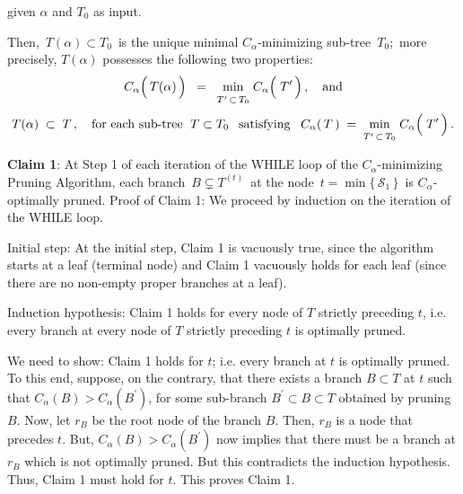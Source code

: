 \begin{proposition}
\begin{itemize}
	given $\alpha$ and $T_{0}$ as input.
\end{itemize}
Then, \,$T(\alpha) \subset T_{0}$\, is the unique
{\color{red}minimal $C_{\alpha}$-minimizing} sub-tree \,$T_{0}$;\,
more precisely, $T(\alpha)$ possesses the following two properties:
\begin{equation*}
C_{\alpha}\!\left(\,\overset{{\color{white}.}}{T}(\alpha)\,\right)
\;\; = \;\;
	\underset{T^{\prime} \,\overset{{\color{white}.}}{\subset}\, T_{0}}{\min}\;
	C_{\alpha}\!\left(\;\overset{{\color{white}.}}{T^{\prime}}\,\right),
\quad
\textnormal{and}
\end{equation*}
\begin{equation*}
T(\alpha) \; \subset \; T\,,
\quad
\textnormal{for each sub-tree \;$T \subset T_{0}$\;\, satisfying}\;\;\;
C_{\alpha}(\,T\,)
\; = \;
	\underset{T^{\prime} \,\overset{{\color{white}.}}{\subset}\, T_{0}}{\min}\;
	C_{\alpha}\!\left(\;\overset{{\color{white}.}}{T^{\prime}}\,\right).
\end{equation*}
\end{proposition}
\proof

\vskip 0.3cm
\noindent
\textbf{Claim 1}:\quad
At Step 1 of each iteration of the WHILE loop of the $C_{\alpha}$-minimizing Pruning Algorithm,
each branch \,$B \subsetneq T^{(t)}$\, at the node \,$t = \min\{\,\mathcal{S}_{1}\,\}$\, is $C_{\alpha}$-optimally pruned.
\vskip 0.2cm
\noindent
Proof of Claim 1:\quad
We proceed by induction on the iteration of the WHILE loop.

\vskip 0.2cm
\noindent
Initial step:\;
At the initial step, Claim 1 is vacuously true, since the algorithm starts at a leaf (terminal node)
and Claim 1 vacuously holds for each leaf (since there are no non-empty proper branches at a leaf).

\vskip 0.2cm
\noindent
Induction hypothesis:\;
Claim 1 holds for every node of $T$ strictly preceding $t$,
i.e. every branch at every node of $T$ strictly preceding $t$ is optimally pruned.

\vskip 0.2cm
\noindent
We need to show:\;
Claim 1 holds for $t$;
i.e. every branch at $t$ is optimally pruned.
To this end, suppose, on the contrary, that
there exists a branch $B \subset T$ at $t$
such that
$C_{\alpha}(B) > C_{\alpha}(B^{\prime})$,
for some sub-branch $B^{\prime} \subset B \subset T$
obtained by pruning $B$.
Now, let $r_{B}$ be the root node of the branch $B$.
Then, $r_{B}$ is a node that precedes $t$.
But, $C_{\alpha}(B) > C_{\alpha}(B^{\prime})$
now implies that there must be a branch at
$r_{B}$ which is not optimally pruned.
But this contradicts the induction hypothesis.
Thus, Claim 1 must hold for $t$.
This proves Claim 1.


